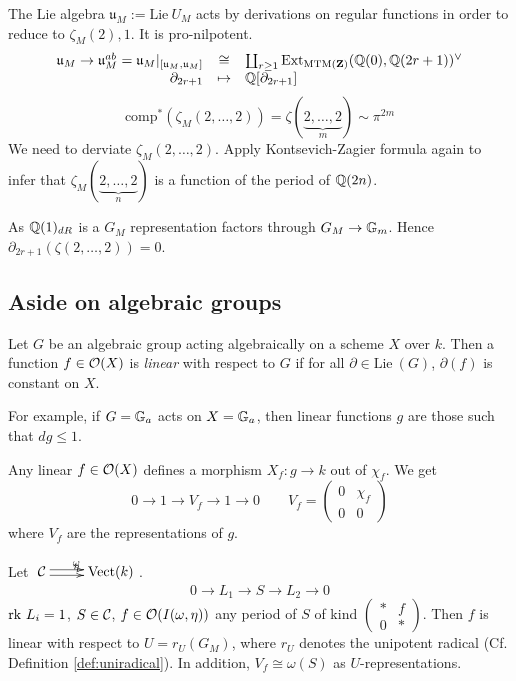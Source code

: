 The Lie algebra $\mathfrak{u}_M := \mathrm{Lie~} U_M$ acts by derivations on regular functions in order to reduce to $\zeta_M(2), 1$. It is pro-nilpotent.
\[\label{eq:KZ2}
\begin{array}{rcl}
\mathfrak{u}_M \to \mathfrak{u}_M^{ab} = \mathfrak{u}_M |_{[\mathfrak{u}_M, \mathfrak{u}_M]} & \cong & \coprod_{r \geq 1} \mathrm{Ext}_{\mathrm{MTM}(\mathbf{Z})}(\mathbb{Q}(0), \mathbb{Q}(2r+1))^{\vee} \\
\partial_{2r+1} & \mapsto & \mathbb{Q}[\partial_{2r+1}]
\end{array}
\]
\[
\mathrm{comp}^*(\zeta_M(2, \ldots, 2)) = \zeta(\underbrace{2, \ldots, 2}_m) \sim \pi^{2m}
\]
We need to derviate $\zeta_M(2, \ldots, 2)$. Apply Kontsevich-Zagier formula again to infer that $\zeta_M(\underbrace{2,\ldots,2}_n)$ is a function of the period of $\mathbb{Q}(2n)$.

As $\mathbb{Q}(1)_{dR}$ is a $G_M$ representation factors through $G_M \to \mathbb{G}_m$. Hence $\partial_{2r+1}(\zeta(2,\ldots,2)) = 0$.

\subsection{Aside on algebraic groups}

\begin{defn}
Let $G$ be an algebraic group acting algebraically on a scheme $X$ over $k$. Then a function $f \in \mathcal{O}(X)$ is \emph{linear} with respect to $G$ if for all $\partial \in \mathrm{Lie~}(G)$, $\partial(f)$ is constant on $X$.
\end{defn}

For example, if $G = \mathbb{G}_a$ acts on $X = \mathbb{G}_a$, then linear functions $g$ are those such that $dg \leq 1$.

\begin{rem}
Any linear $f \in \mathcal{O}(X)$ defines a morphism $X_f : g \to k$ out of $\chi_f$. We get
\[
0 \to 1 \to V_f \to 1 \to 0 \qquad V_f = \left( \begin{array}{cc}
0 & \chi_f \\
0 & 0
\end{array} \right)
\]
where $V_f$ are the representations of $g$.
\end{rem}

\begin{lemma}
Let $\xymatrix{ \cC \ar@<0.2em>[r]^{\omega} \ar@<-0.2em>[r]^{\eta} & \mathrm{Vect}(k) }$.
\[
0 \to L_1 \to S \to L_2 \to 0
\]
$\mathrm{rk}~ L_i = 1$, $S \in \mathcal{C}$, $f \in \mathcal{O}(I(\omega, \eta))$ any period of $S$ of kind $\left( \begin{array}{cc}
* & f \\
0 & *
\end{array} \right)$. Then $f$ is linear with respect to $U = r_U(G_M)$, where $r_U$ denotes the unipotent radical (Cf. Definition \ref{def:uniradical}). In addition, $V_f \cong \omega(S)$ as $U$-representations.
\end{lemma}

